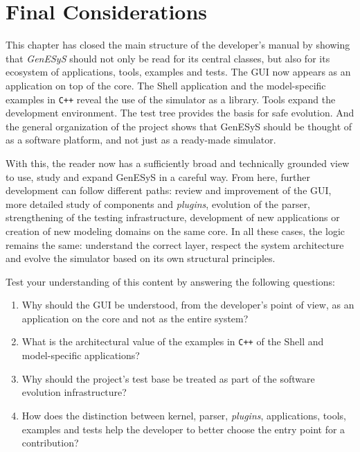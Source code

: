 \section{Final Considerations}
\label{sec:cap10_consideracoes_finais}

This chapter has closed the main structure of the developer's manual by showing that \textit{GenESyS} should not only be read for its central classes, but also for its ecosystem of applications, tools, examples and tests. The GUI now appears as an application on top of the core. The Shell application and the model-specific examples in \texttt{C++} reveal the use of the simulator as a library. Tools expand the development environment. The test tree provides the basis for safe evolution. And the general organization of the project shows that GenESyS should be thought of as a software platform, and not just as a ready-made simulator.

With this, the reader now has a sufficiently broad and technically grounded view to use, study and expand GenESyS in a careful way. From here, further development can follow different paths: review and improvement of the GUI, more detailed study of components and \textit{plugins}, evolution of the parser, strengthening of the testing infrastructure, development of new applications or creation of new modeling domains on the same core. In all these cases, the logic remains the same: understand the correct layer, respect the system architecture and evolve the simulator based on its own structural principles.

Test your understanding of this content by answering the following questions:

\begin{enumerate}
 \item Why should the GUI be understood, from the developer's point of view, as an application on the core and not as the entire system?

\item What is the architectural value of the examples in \texttt{C++} of the Shell and model-specific applications?

\item Why should the project's test base be treated as part of the software evolution infrastructure?

\item How does the distinction between kernel, parser, \textit{plugins}, applications, tools, examples and tests help the developer to better choose the entry point for a contribution?
\end{enumerate}
